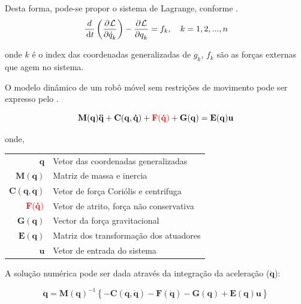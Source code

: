 Desta forma, pode-se propor o sistema de Lagrange, conforme .
\begin{equation}
    \frac{d}{\df{t}}\left( \parcial{}{\mathcal{L}}{\dot{q}_k}\right)
    -\parcial{}{\mathcal{L}}{q_k}
    = f_k, \quad k = 1,2,...,n
    \label{eq:lag4}
\end{equation}


\noindent onde $k$ é o index das coordenadas generalizadas de $g_k$, $f_k$ são as forças externas que agem no sistema.

O modelo dinâmico de um robô móvel sem restrições de movimento pode ser expresso pelo .

\begin{equation}
    \mathbf{M(q)\ddot{q}+ C(q, \dot{q})+ \textcolor{red}{F(\dot{q})}+G(q) = E(q)u}
    \label{eq:lag5}
\end{equation}

\noindent onde, 

\begin{tabular}{ r | l }
  $\mathbf{q}$               & Vetor das coordenadas generalizadas    \\
  $\mathbf{M(q)}$            & Matriz de massa e inercia              \\
  $\mathbf{C(q, \dot{q})}$   & Vetor de força Coriólis e centrifuga   \\
  $\color{red}{\mathbf{F(\dot{q})}}$      & Vetor de atrito, força não conservativa\\
  $\mathbf{G(q)}$            & Vector da força gravitacional          \\
  $\mathbf{E(q)}$            & Matriz dos transformação dos atuadores \\
  $\mathbf{u}$               & Vetor de entrada do sistema            \\
\end{tabular}


A solução numérica pode ser dada através da integração da aceleração ($\mathbf{\ddot{q}}$):

\begin{equation}
    \mathbf{\ddot{q}}=\mathbf{M(q)}^{-1}\left\{\mathbf{-C(q, \dot{q})-F(\dot{q})-G(q) + E(q)u}\right\}
\end{equation}




